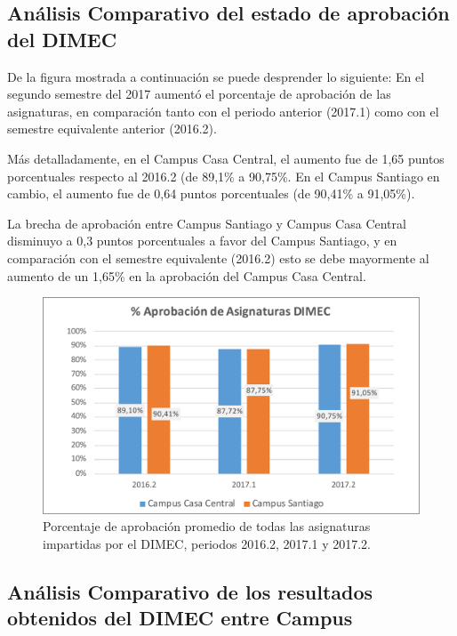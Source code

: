 \documentclass[12pt]{article}
\begin{document}
\subsection{Análisis Comparativo del estado de aprobación del DIMEC}
\begin{text}
De la figura mostrada a continuación se puede desprender lo siguiente: En el segundo semestre del 2017 aumentó el porcentaje de aprobación de las asignaturas, en comparación tanto con el periodo anterior (2017.1) como con el semestre equivalente anterior (2016.2).\par
Más detalladamente, en el Campus Casa Central, el aumento fue de 1,65 puntos porcentuales respecto al 2016.2 (de 89,1\% a 90,75\%. En el Campus Santiago en cambio, el aumento fue de 0,64 puntos porcentuales (de 90,41\% a 91,05\%).\par
La brecha de aprobación entre Campus Santiago y Campus Casa Central disminuyo a 0,3 puntos porcentuales a favor del Campus Santiago, y en comparación con el semestre equivalente (2016.2) esto se debe mayormente al aumento de un 1,65\% en la aprobación del Campus Casa Central. \par

\end{text}
 
\begin{figure}[H]
    \centering
    \includegraphics[width=1\textwidth]{AR2Aprob.pdf}
    \caption{Porcentaje de aprobación promedio de todas las asignaturas impartidas por el DIMEC, periodos 2016.2, 2017.1 y 2017.2.}
    \label{fig:resp}
\end{figure}
\newpage
\subsection{Análisis Comparativo de los resultados obtenidos del DIMEC entre Campus}
\end{document}
